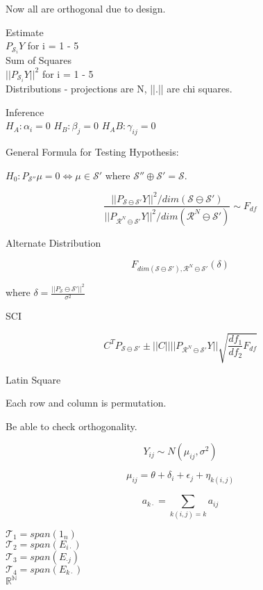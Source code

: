 \documentclass[11pt,fleqn]{book} %
\begin{document}
Now all are orthogonal due to design. 

Estimate\\

$P_{\mathcal{S}_i}Y$ for i = 1 - 5\\

Sum of Squares\\

$||P_{\mathcal{S}_i}Y||^2$ for i = 1 - 5\\

Distributions - projections are N, ||.|| are chi squares. 

Inference\\

$H_A: \alpha_i = 0$
$H_B: \beta_j = 0$
$H_AB: \gamma_{ij} = 0$

	General Formula for Testing Hypothesis:

	$H_0: P_{\mathcal{S}''}\mu = 0 \Leftrightarrow \mu \in \mathcal{S}'$ where $\mathcal{S}'' \oplus \mathcal{S'} = \mathcal{S}$. 


			$$\frac{||P_{\mathcal{S} \ominus \mathcal{S'}}Y||^2/dim(\mathcal{S} \ominus \mathcal{S'})}{||P_{\mathcal{R}^N \ominus \mathcal{S'}}Y||^2/dim(\mathcal{R}^N \ominus \mathcal{S'})} \sim F_{df} $$

	Alternate Distribution

			$$F_{dim(\mathcal{S} \ominus \mathcal{S'}), \mathcal{R}^N \ominus \mathcal{S'}}(\delta) $$

	where $\delta = \frac{||P_\mathcal{S} \ominus \mathcal{S'}||^2}{\sigma^2}$

	SCI

			$$C^T P_{\mathcal{S} \ominus \mathcal{S'}} \pm ||C|| ||P_{\mathcal{R}^N \ominus \mathcal{S'}}Y|| \sqrt{\frac{df_1}{df_2} F_{df}} $$


Latin Square

		Each row and column is permutation. 

		Be able to check orthogonality. 

		$$Y_{ij} \sim N(\mu_{ij}, \sigma^2) $$

		$$\mu_{ij} = \theta + \delta_i + \epsilon_j + \eta_{k(i,j)} $$

		$$a_{k\cdot} = \sum_{k(i,j) =k} a_{ij}$$

$\mathcal{T}_1 =  span(1_n) $\\
$\mathcal{T}_2 = span(E_{i\cdot}) $ \\
$\mathcal{T}_3 = span(E_{\cdot j}) $ \\
$\mathcal{T}_4 = span(E_{k\cdot}) $ \\ 
$\mathbb{R^N}$ 
\end{document}
